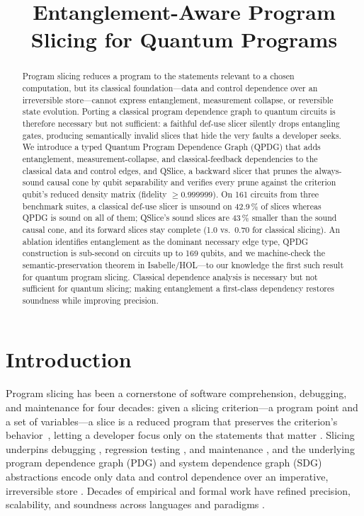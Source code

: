 \documentclass[10pt,conference]{IEEEtran}
\theoremstyle{definition}
\begin{document}
\title{Entanglement-Aware Program Slicing for Quantum Programs}
\author{}
\maketitle

\begin{abstract}
Program slicing reduces a program to the statements relevant to a chosen computation, but its classical foundation---data and control dependence over an irreversible store---cannot express entanglement, measurement collapse, or reversible state evolution. Porting a classical program dependence graph to quantum circuits is therefore necessary but not sufficient: a faithful def-use slicer silently drops entangling gates, producing semantically invalid slices that hide the very faults a developer seeks. We introduce a typed Quantum Program Dependence Graph (QPDG) that adds entanglement, measurement-collapse, and classical-feedback dependencies to the classical data and control edges, and QSlice, a backward slicer that prunes the always-sound causal cone by qubit separability and verifies every prune against the criterion qubit's reduced density matrix (fidelity $\geq 0.999999$). On 161 circuits from three benchmark suites, a classical def-use slicer is unsound on 42.9\,\% of slices whereas QPDG is sound on all of them; QSlice's sound slices are 43\,\% smaller than the sound causal cone, and its forward slices stay complete (1.0 vs.\ 0.70 for classical slicing). An ablation identifies entanglement as the dominant necessary edge type, QPDG construction is sub-second on circuits up to 169 qubits, and we machine-check the semantic-preservation theorem in Isabelle/HOL---to our knowledge the first such result for quantum program slicing. Classical dependence analysis is necessary but not sufficient for quantum slicing; making entanglement a first-class dependency restores soundness while improving precision.
\end{abstract}

\section{Introduction}

Program slicing has been a cornerstone of software comprehension, debugging, and maintenance for four decades: given a slicing criterion---a program point and a set of variables---a slice is a reduced program that preserves the criterion's behavior~\cite{xu2005brief}, letting a developer focus only on the statements that matter \cite{weiser1982programmers, tip1994a}. Slicing underpins debugging \cite{gallagher1991using}, regression testing \cite{binkley1998the}, and maintenance \cite{harman2008program}, and the underlying program dependence graph (PDG) and system dependence graph (SDG) abstractions encode only data and control dependence over an imperative, irreversible store \cite{ferrante1987pdg, horwitz1990interprocedural, sinha1999sdg}. Decades of empirical and formal work have refined precision, scalability, and soundness across languages and paradigms \cite{binkley2004a, binkley2014orbs, blazy2015verified, olmedo2025slicing}.
\end{document}
